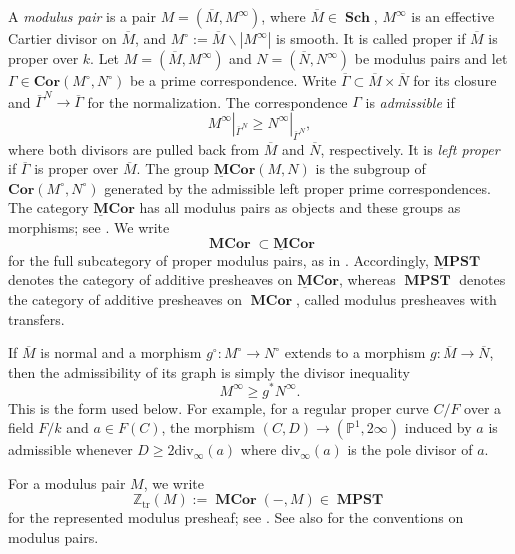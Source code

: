 \documentclass[a4paper,12pt,reqno]{amsart}
\numberwithin{equation}{section}
\theoremstyle{definition}
\newcommand{\Z}{\mathbb{Z}}
\newcommand{\bP}{\mathbb{P}}
\newcommand{\MPST}{\operatorname{\mathbf{MPST}}}
\newcommand{\ulMPST}{\operatorname{\mathbf{{\underline{M}}PST}}}
\newcommand{\Sch}{\operatorname{\mathbf{Sch}}}
\newcommand{\Cork}{\mathbf{Cor}}
\newcommand{\MCor}{\operatorname{\mathbf{MCor}}}
\newcommand{\ulMCor}{\operatorname{\mathbf{{\underline{M}}Cor}}}
\newcommand{\Ztr}{\Z_{\mathrm{tr}}}
\begin{document}
A \emph{modulus pair} is a pair $M=(\overline M,M^\infty)$, where
$\overline M\in\Sch$, $M^\infty$ is an effective Cartier divisor on
$\overline M$, and
$M^\circ:=\overline M\smallsetminus |M^\infty|$ is smooth.  It is called
proper if $\overline M$ is proper over $k$.  Let
$M=(\overline M,M^\infty)$ and $N=(\overline N,N^\infty)$ be modulus
pairs and let $\Gamma\in\Cork(M^\circ,N^\circ)$ be a prime
correspondence.  Write $\overline\Gamma\subset\overline M\times\overline N$
for its closure and $\overline\Gamma^N\to\overline\Gamma$ for the
normalization.  The correspondence $\Gamma$ is \emph{admissible} if
\begin{equation}\label{eq:admissdef}
 M^\infty|_{\overline\Gamma^N}
 \geq
 N^\infty|_{\overline\Gamma^N},
\end{equation}
where both divisors are pulled back from $\overline M$ and $\overline N$,
respectively.  
It is \emph{left proper} if $\overline\Gamma$ is proper
over $\overline M$.  The group $\ulMCor(M,N)$ is the subgroup of
$\Cork(M^\circ,N^\circ)$ generated by the admissible left proper prime
correspondences.  The category $\ulMCor$ has all modulus pairs
as objects and these groups as morphisms; see \cite[Section~2.2]{RSY22}.
We write
\[
 \MCor\subset \ulMCor
\]
for the full subcategory of proper modulus pairs, as in
\cite[Section~2.11]{RSY22}.  Accordingly,
$\ulMPST$ denotes the category of additive presheaves on
$\ulMCor$, whereas $\MPST$ denotes the category of additive
presheaves on $\MCor$, called modulus presheaves with transfers.


If $\overline M$ is normal and a morphism
$g^\circ:M^\circ\to N^\circ$ extends to a morphism
$g:\overline M\to\overline N$, then the admissibility of its graph is
simply the divisor inequality
\begin{equation}\label{eq:admissmap}
 M^\infty\geq g^*N^\infty.
\end{equation}
This is the form used below.  For example, for a regular proper curve $C/F$ over a field $F/k$
and $a\in F(C)$, the morphism
$(C,D)\to(\bP^1,2\infty)$ induced by $a$ is admissible whenever 
$D\geq 2\mathrm{div}_\infty(a)$ where $\mathrm{div}_\infty(a)$ is the pole divisor of $a$.

For a modulus pair $M$, we write
\begin{equation}\label{eq:ZtrMod}
 \Ztr(M):=\MCor(-,M)\in\MPST
\end{equation}
for the represented modulus presheaf; see \cite[Section~3.5]{RSY22}.
See also \cite[Definition~5.1]{HS25} for the conventions on modulus pairs.
\end{document}
